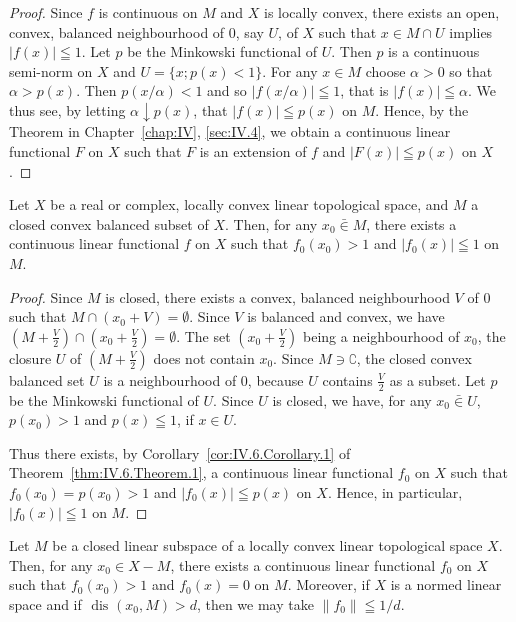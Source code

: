 \begin{proof}
 Since $f$ is continuous on $M$ and $X$ is locally convex, there exists an open, convex, balanced neighbourhood of $0$, say $U$, of $X$ such that $x \in M \cap U$ implies $|f(x)| \leqq 1$. Let $p$ be the Minkowski functional of $U$. Then $p$ is a continuous semi-norm on $X$ and $U = \{x; p(x) < 1\}$. For any $x \in M$ choose $\alpha > 0$ so that $\alpha > p(x)$. Then $p(x/\alpha) < 1$ and so $|f(x/\alpha)| \leqq 1$, that is $|f(x)| \leqq \alpha$. We thus see, by letting $\alpha \downarrow p(x)$, that $|f(x)| \leqq p(x)$ on $M$. Hence, by the Theorem in Chapter~\ref{chap:IV}, \ref{sec:IV.4}, we obtain a continuous linear functional $F$ on $X$ such that $F$ is an extension of $f$ and $|F(x)| \leqq p(x)$ on $X$. 
\end{proof}

\begin{theorem}\label{thm:IV.6.Theorem.3} Let $X$ be a real or complex, locally convex linear topological space, and $M$ a closed convex balanced subset of $X$. Then, for any $x_0 \bar{\in} M$, there exists a continuous linear functional $f$ on $X$ such that $f_0(x_0) > 1$ and $|f_0(x)| \leqq 1$ on $M$. 
\end{theorem}

\begin{proof}
 Since $M$ is closed, there exists a convex, balanced neighbourhood $V$ of $0$ such that $M \cap (x_0 + V) = \emptyset$. Since $V$ is balanced and convex, we have $\left(M + \frac{V}{2}\right) \cap \left(x_0 + \frac{V}{2}\right) = \emptyset$. The set $\left(x_0 + \frac{V}{2}\right)$ being a neighbourhood of $x_0$, the closure $U$ of $\left(M + \frac{V}{2}\right)$ does not contain $x_0$. Since $M \ni \complement$, the closed convex balanced set $U$ is a neighbourhood of $0$, because $U$ contains $\frac{V}{2}$ as a subset. Let $p$ be the Minkowski functional of $U$. Since $U$ is closed, we have, for any $x_0 \bar{\in} U$, $p(x_0) > 1$ and $p(x) \leqq 1$, if $x \in U$. 

Thus there exists, by Corollary~\ref{cor:IV.6.Corollary.1} of Theorem~\ref{thm:IV.6.Theorem.1}, a continuous linear functional $f_0$ on $X$ such that $f_0(x_0) = p(x_0) > 1$ and $|f_0(x)| \leqq p(x)$ on $X$. Hence, in particular, $|f_0(x)| \leqq 1$ on $M$. 
\end{proof}

\begin{corollaryu} Let $M$ be a closed linear subspace of a locally convex linear topological space $X$. Then, for any $x_0 \in X - M$, there exists a continuous linear functional $f_0$ on $X$ such that $f_0(x_0) > 1$ and $f_0(x) = 0$ on $M$. Moreover, if $X$ is a normed linear space and if $\text{ dis } (x_0, M) > d$, then we may take $\|f_0\| \leqq 1 / d$. 
\end{corollaryu}

